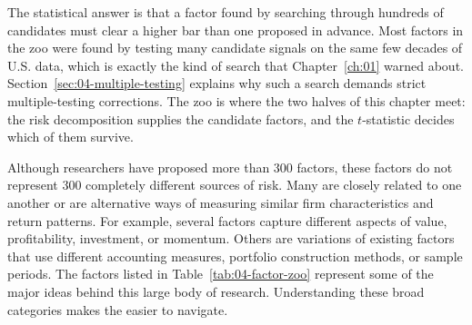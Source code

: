 The statistical answer is that a factor found by searching through hundreds of candidates must clear a higher bar than one proposed in advance. Most factors in the zoo were found by testing many candidate signals on the same few decades of U.S. data, which is exactly the kind of search that Chapter~\ref{ch:01} warned about. Section~\ref{sec:04-multiple-testing} explains why such a search demands strict multiple-testing corrections. The zoo is where the two halves of this chapter meet: the risk decomposition supplies the candidate factors, and the $t$-statistic decides which of them survive.

Although researchers have proposed more than 300 factors, these
factors do not represent 300 completely different sources of risk.
Many are closely related to one another or are alternative ways of
measuring similar firm characteristics and return patterns. For
example, several factors capture different aspects of value,
profitability, investment, or momentum. Others are variations of
existing factors that use different accounting measures, portfolio
construction methods, or sample periods. The factors listed in
Table~\ref{tab:04-factor-zoo} represent some of the major ideas
behind this large body of research. Understanding these broad
categories makes the  easier to navigate.

